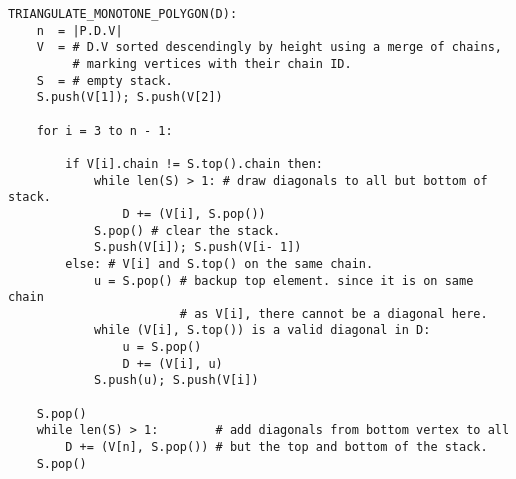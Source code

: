 \begin{verbatim}
TRIANGULATE_MONOTONE_POLYGON(D):
    n  = |P.D.V|
    V  = # D.V sorted descendingly by height using a merge of chains,
         # marking vertices with their chain ID.
    S  = # empty stack.
    S.push(V[1]); S.push(V[2])

    for i = 3 to n - 1:

        if V[i].chain != S.top().chain then:
            while len(S) > 1: # draw diagonals to all but bottom of stack.
                D += (V[i], S.pop())
            S.pop() # clear the stack.
            S.push(V[i]); S.push(V[i- 1])
        else: # V[i] and S.top() on the same chain.
            u = S.pop() # backup top element. since it is on same chain
                        # as V[i], there cannot be a diagonal here.
            while (V[i], S.top()) is a valid diagonal in D:
                u = S.pop()
                D += (V[i], u)
            S.push(u); S.push(V[i])

    S.pop()
    while len(S) > 1:        # add diagonals from bottom vertex to all
        D += (V[n], S.pop()) # but the top and bottom of the stack.
    S.pop()
\end{verbatim}

